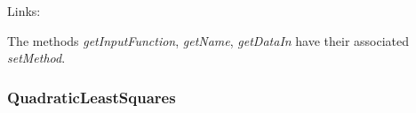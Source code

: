 \begin{description}
\begin{description}
\end{description}

\item[Links:]
\end{description}

The methods \textit{getInputFunction}, \textit{getName}, \textit{getDataIn} have their associated \textit{setMethod}.



\newpage
\subsubsection{QuadraticLeastSquares}

